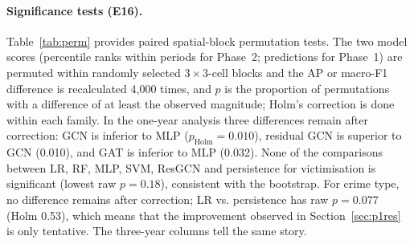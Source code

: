 \documentclass[11pt,a4paper]{report}
\begin{document}
\paragraph{Significance tests (E16).} Table~\ref{tab:perm} provides paired spatial-block permutation tests. The two model scores (percentile ranks within periods for Phase~2; predictions for Phase~1) are permuted within randomly selected $3\times3$-cell blocks and the AP or macro-F1 difference is recalculated 4,000 times, and $p$ is the proportion of permutations with a difference of at least the observed magnitude; Holm's correction is done within each family. In the one-year analysis three differences remain after correction: GCN is inferior to MLP ($p_\mathrm{Holm}=0.010$), residual GCN is superior to GCN (0.010), and GAT is inferior to MLP (0.032). None of the comparisons between LR, RF, MLP, SVM, ResGCN and persistence for victimisation is significant (lowest raw $p=0.18$), consistent with the bootstrap. For crime type, no difference remains after correction; LR vs. persistence has raw $p=0.077$ (Holm 0.53), which means that the improvement observed in Section~\ref{sec:p1res} is only tentative. The three-year columns tell the same story.
\end{document}
